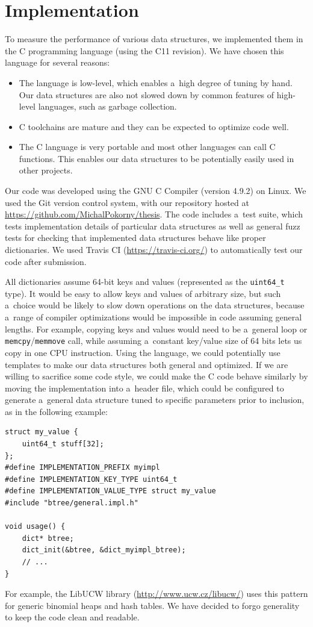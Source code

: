 \chapter{Implementation}
\label{chapter:implementation}
To measure the performance of various data structures, we implemented them
in the C programming language (using the C11 revision).
We have chosen this language for several reasons:
\begin{itemize}
\item The language is low-level, which enables a~high degree of tuning by hand.
	Our data structures are also not slowed down by common features of
	high-level languages, such as garbage collection.
\item C toolchains are mature and they can be expected to optimize code well.
\item The C language is very portable and most other languages can
	call C functions. This enables our data structures to be potentially
	easily used in other projects.
\end{itemize}

Our code was developed using the GNU C Compiler (version 4.9.2) on Linux.
We used the Git version control system, with our repository hosted at
\url{https://github.com/MichalPokorny/thesis}. The code includes a~test suite,
which tests implementation details of particular data structures as well
as general fuzz tests for checking that implemented data structures behave
like proper dictionaries. We used Travis CI (\url{https://travis-ci.org/})
to automatically test our code after submission.

All dictionaries assume 64-bit keys and values (represented as the
\texttt{uint64\_t} type). It would be easy to allow keys and values of arbitrary
size, but such a~choice would be likely to slow down operations on
the data structures, because a~range of compiler optimizations would
be impossible in code assuming general lengths. For example, copying
keys and values would need to be a~general loop or
\texttt{memcpy}/\texttt{memmove} call, while assuming a~constant key/value
size of 64 bits lets us copy in one CPU instruction. Using the \Cpp language,
we could potentially use templates to make our data structures both general
and optimized. If we are willing to sacrifice some code style, we could
make the C code behave similarly by moving the implementation into a~header
file, which could be configured to generate a~general data structure
tuned to specific parameters prior to inclusion, as in the following example:
\begin{lstlisting}
struct my_value {
	uint64_t stuff[32];
};
#define IMPLEMENTATION_PREFIX myimpl
#define IMPLEMENTATION_KEY_TYPE uint64_t
#define IMPLEMENTATION_VALUE_TYPE struct my_value
#include "btree/general.impl.h"

void usage() {
	dict* btree;
	dict_init(&btree, &dict_myimpl_btree);
	// ...
}
\end{lstlisting}
For example, the LibUCW library (\url{http://www.ucw.cz/libucw/})
uses this pattern for generic binomial heaps and hash tables.
We have decided to forgo generality to keep the code clean and readable.

